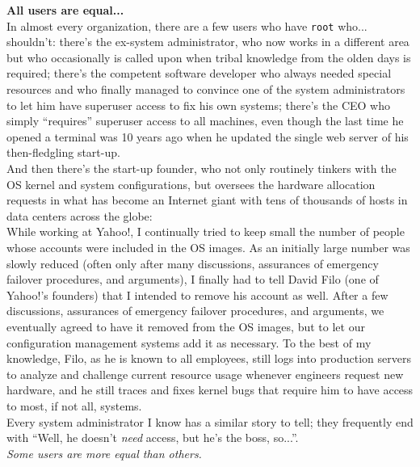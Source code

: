 \begin{experience}
{\bf All users are equal...} \\

In almost every organization, there are a few users
who have {\tt root} who... shouldn't: there's the
ex-system administrator, who now works in a different
area but who occasionally is called upon when tribal
knowledge from the olden days is required; there's the
competent software developer who always needed special
resources and who finally managed to convince one of
the system administrators to let him have superuser
access to fix his own systems; there's the CEO who
simply ``requires'' superuser access to all machines,
even though the last time he opened a terminal was 10
years ago when he updated the single web server of his
then-fledgling start-up. \\ [10pt]

And then there's the start-up founder, who not only
routinely tinkers with the OS kernel and system
configurations, but oversees the hardware allocation
requests in what has become an Internet giant with
tens of thousands of hosts in data centers across the
globe: \\ [10pt]

While working at Yahoo!, I continually tried to keep
small the number of people whose accounts were
included in the OS images.  As an initially large
number was slowly reduced (often only after many
discussions, assurances of emergency failover
procedures, and arguments), I finally had to tell
David Filo (one of Yahoo!'s
founders) that I intended to remove his account as
well.  After a few discussions, assurances of
emergency failover procedures, and arguments, we
eventually agreed to have it removed from the OS
images, but to let our configuration management
systems add it as necessary.  To the best of my
knowledge, Filo, as he is known to all employees,
still logs into production servers to analyze and
challenge current resource usage whenever engineers
request new hardware, and he still traces and fixes
kernel bugs that require him to have access to most,
if not all, systems.  \\[10pt]

Every system administrator I know has a similar story
to tell; they frequently end with ``Well, he doesn't
{\em need} access, but he's the boss, so...''. \\
[10pt]

{\em Some users are more equal than others.}
\end{experience}

